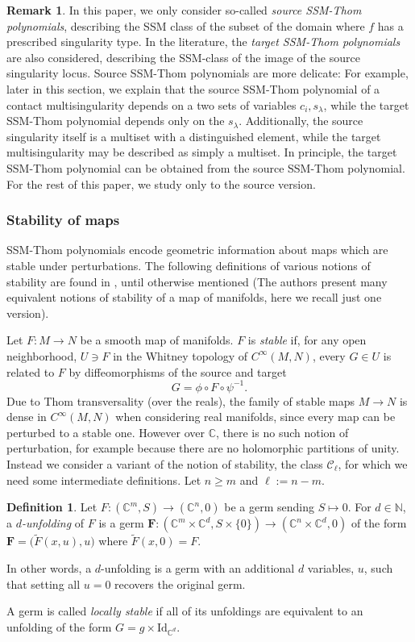 \documentclass[11pt]{article}
\theoremstyle{plain}
\theoremstyle{definition}
\newtheorem{remark}[fact]{Remark}
\newtheorem{definition}[fact]{Definition}
\theoremstyle{definition}
\newcommand{\bb}[1]{\mathbb{#1}}
\newcommand{\C}{\mathbb{C}}
\begin{document}
\begin{remark}
In this paper, we only consider so-called \textit{source SSM-Thom polynomials}, describing the SSM class of the subset of the domain where $f$ has a prescribed singularity type. In the literature, the \textit{target SSM-Thom polynomials} are also considered, describing the SSM-class of the image of the source singularity locus. Source SSM-Thom polynomials are more delicate: For example, later in this section, we explain that the source SSM-Thom polynomial of a contact multisingularity depends on a two sets of variables $c_i,s_\lambda$, while the target SSM-Thom polynomial depends only on the $s_\lambda$. Additionally, the source singularity itself is a multiset with a distinguished element, while the target multisingularity may be described as simply a multiset. In principle, the target SSM-Thom polynomial can be obtained from the source SSM-Thom polynomial. For the rest of this paper, we study only to the source version. 
\end{remark}



\subsubsection{Stability of maps}
SSM-Thom polynomials encode geometric information about maps which are stable under perturbations. The following definitions of various notions of stability are found in \cite{mn20}, until otherwise mentioned (The authors present many equivalent notions of stability of a map of manifolds, here we recall just one version).

Let $F: M\to N$ be a smooth map of manifolds. $F$ is \textit{stable} if, for any open neighborhood, $U \ni F$ in the Whitney topology of $C^\infty(M,N)$, every $G \in U$ is related to $F$ by diffeomorphisms of the source and target
\[
G=\phi \circ F\circ \psi^{-1}.
\]
Due to Thom transversality (over the reals), the family of stable maps $M\to N$ is dense in $C^\infty(M,N)$ when considering real manifolds, since every map can be perturbed to a stable one. However over $\C$, there is no such notion of perturbation, for example because there are no holomorphic partitions of unity. Instead we consider a variant of the notion of stability, the class $\mathcal C_\ell$, for which we need some intermediate definitions. Let $n\geq m$ and $\ell:=n-m.$

\begin{definition}\label{defn-stable}
    Let $F: (\C^m,S)\to (\C^n,0)$ be a germ sending $S \mapsto 0$. For $d\in \bb N$, a \textit{$d$-unfolding} of $F$ is a germ $\textbf{F}: (\C^m\times \C^d,S\times \{0\})\to (\C^n\times \C^d,0)$ of the form $\textbf{F} = \big(\tilde F(x,u),u\big)$ where $\tilde F(x,0)=F$.
    
    In other words, a $d$-unfolding is a germ with an additional $d$ variables, $u$, such that setting all $u=0$ recovers the original germ. 

    A germ is called \textit{locally stable} if all of its unfoldings are equivalent to an unfolding of the form $G=g\times \text{Id}_{\C^d}$.
\end{definition}
\end{document}
